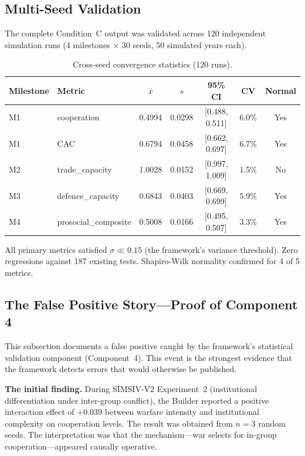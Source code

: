 \documentclass[11pt,a4paper]{article}
\begin{document}
\subsection{Multi-Seed Validation}

The complete Condition~C output was validated across 120 independent simulation runs (4 milestones $\times$ 30 seeds, 50 simulated years each).

\begin{table}[ht]
\centering
\caption{Cross-seed convergence statistics (120 runs).}
\label{tab:convergence}
\begin{tabular}{@{}llccccc@{}}
\toprule
Milestone & Metric & $\bar{x}$ & $s$ & 95\% CI & CV & Normal \\
\midrule
M1 & cooperation & 0.4994 & 0.0298 & [0.488, 0.511] & 6.0\% & Yes \\
M1 & CAC & 0.6794 & 0.0458 & [0.662, 0.697] & 6.7\% & Yes \\
M2 & trade\_capacity & 1.0028 & 0.0152 & [0.997, 1.009] & 1.5\% & No \\
M3 & defence\_capacity & 0.6843 & 0.0403 & [0.669, 0.699] & 5.9\% & Yes \\
M4 & prosocial\_composite & 0.5008 & 0.0166 & [0.495, 0.507] & 3.3\% & Yes \\
\bottomrule
\end{tabular}
\end{table}

All primary metrics satisfied $\sigma \ll 0.15$ (the framework's variance threshold). Zero regressions against 187 existing tests. Shapiro-Wilk normality confirmed for 4 of 5 metrics.

\subsection{The False Positive Story---Proof of Component 4}

This subsection documents a false positive caught by the framework's statistical validation component (Component~4). This event is the strongest evidence that the framework detects errors that would otherwise be published.

\textbf{The initial finding.} During SIMSIV-V2 Experiment~2 (institutional differentiation under inter-group conflict), the Builder reported a positive interaction effect of $+0.039$ between warfare intensity and institutional complexity on cooperation levels. The result was obtained from $n = 3$ random seeds. The interpretation was that the \citet{bowles2006} mechanism---war selects for in-group cooperation---appeared causally operative.
\end{document}
